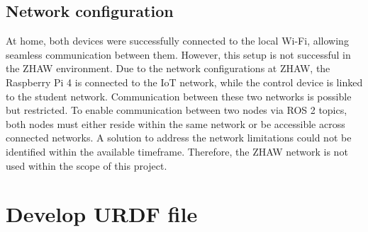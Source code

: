 \subsection{Network configuration}

At home, both devices were successfully connected to the local Wi-Fi, allowing seamless communication between them. However, this setup is not successful in the ZHAW environment.
Due to the network configurations at ZHAW, the Raspberry Pi 4 is connected to the IoT network, while the control device is linked to the student network. Communication between these two networks is possible but restricted. To enable communication between two nodes via ROS 2 topics, both nodes must either reside within the same network or be accessible across connected networks. A solution to address the network limitations could not be identified within the available timeframe. Therefore, the ZHAW network is not used within the scope of this project. 




\section{Develop URDF file}


